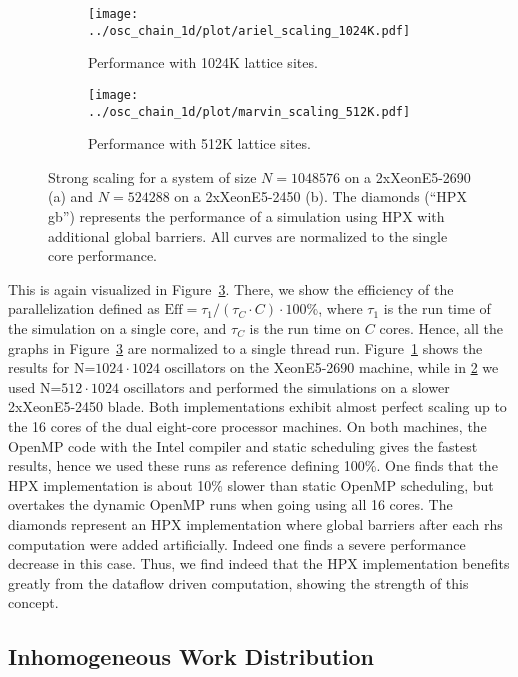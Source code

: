\documentclass[10pt]{elsarticle}
\begin{document}
\begin{figure}
 \begin{subfigure}[b]{0.49\textwidth}
  \centering
  \texttt{[image: ../osc\_chain\_1d/plot/ariel\_scaling\_1024K.pdf]}\hfill
  \caption{Performance with 1024K lattice sites.} 
  \label{fig:scaling_ariel_1024K}
 \end{subfigure}
 \begin{subfigure}[b]{0.49\textwidth}
  \centering
  \texttt{[image: ../osc\_chain\_1d/plot/marvin\_scaling\_512K.pdf]}\hfill
  \caption{Performance with 512K lattice sites.} 
  \label{fig:scaling_marvin_512K}
 \end{subfigure}
 \caption{Strong scaling for a system of size $N=1048576$ on a 2xXeonE5-2690 (a) and $N=524288$ on a 2xXeonE5-2450 (b). The diamonds (``HPX gb'') represents the performance of a simulation using HPX with additional global barriers. All curves are normalized to the single core performance.
 }
 \label{fig:scaling1D}
\end{figure}

This is again visualized in Figure~\ref{fig:scaling1D}.
There, we show the efficiency of the parallelization defined as $\text{Eff} = \tau_1/(\tau_C\cdot C) \cdot100\%$, where $\tau_1$ is the run time of the simulation on a single core, and $\tau_C$ is the run time on $C$ cores.
Hence, all the graphs in Figure~\ref{fig:scaling1D} are normalized to a single thread run.
Figure~\ref{fig:scaling_ariel_1024K} shows the results for N=$1024\cdot1024$ oscillators on the XeonE5-2690 machine, while in \ref{fig:scaling_marvin_512K} we used N=$512\cdot1024$ oscillators and performed the simulations on a slower 2xXeonE5-2450 blade.
Both implementations exhibit almost perfect scaling up to the 16 cores of the dual eight-core processor machines.
On both machines, the OpenMP code with the Intel compiler and static scheduling gives the fastest results, hence we used these runs as reference defining 100\%.
One finds that the HPX implementation is about 10\% slower than static OpenMP scheduling, but overtakes the dynamic OpenMP runs when going using all 16 cores.
The diamonds represent an HPX implementation where global barriers after each rhs computation were added artificially.
Indeed one finds a severe performance decrease in this case.
Thus, we find indeed that the HPX implementation benefits greatly from the dataflow driven computation, showing the strength of this concept.

\subsection{Inhomogeneous Work Distribution}
\end{document}
